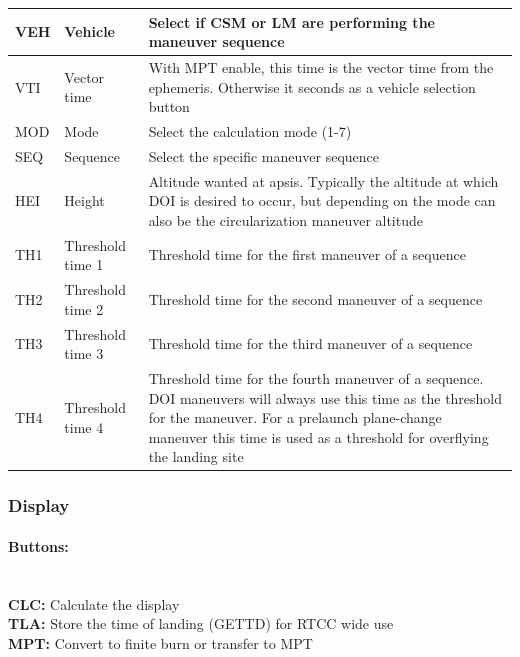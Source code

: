 \documentclass[11pt]{article} %
\begin{document}
\begin{center}
\begin{tabular}{ | m{1cm} | m{4cm} | m{8.5cm} |}
\hline
VEH&Vehicle&Select if CSM or LM are performing the maneuver sequence\\
\hline
VTI&Vector time&With MPT enable, this time is the vector time from the ephemeris. Otherwise it seconds as a vehicle selection button\\
MOD&Mode&Select the calculation mode (1-7)\\
\hline
SEQ&Sequence&Select the specific maneuver sequence\\
\hline
HEI&Height&Altitude wanted at apsis. Typically the altitude at which DOI is desired to occur, but depending on the mode can also be the circularization maneuver altitude\\
\hline
TH1&Threshold time 1&Threshold time for the first maneuver of a sequence\\
\hline
TH2&Threshold time 2&Threshold time for the second maneuver of a sequence\\
\hline
TH3&Threshold time 3&Threshold time for the third maneuver of a sequence\\
\hline
TH4&Threshold time 4&Threshold time for the fourth maneuver of a sequence. DOI maneuvers will always use this time as the threshold for the maneuver. For a prelaunch plane-change maneuver this time is used as a threshold for overflying the landing site\\
\hline
\end{tabular}
\end{center}

\newpage
\subsubsection{Display}
\paragraph{Buttons:}\mbox{} \\

\textbf{CLC:} Calculate the display\\
\textbf{TLA:} Store the time of landing (GETTD) for RTCC wide use\\
\textbf{MPT:} Convert to finite burn or transfer to MPT\\
\end{document}
